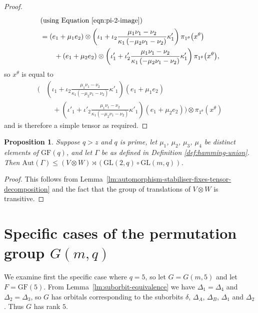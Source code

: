 \documentclass[10pt]{amsart}
\theoremstyle{definition}
\theoremstyle{plain}
\theoremstyle{plain}
\newtheorem{prop}[prop]{Proposition}
\theoremstyle{plain}
\theoremstyle{plain}
\newcommand{\Aut}{\mathrm{Aut}}
\newcommand{\GF}{\mathrm{GF}}
\newcommand{\GL}{\mathrm{GL}}
\begin{document}
\begin{proof}
\begin{align*}
    \intertext{(using Equation \eqref{eqn:pi-2-image}) }
    &= \left(e_1 + \mu_1 e_2 \right) \otimes \left(\iota_1 + \iota_2 \frac{\mu_1 \nu_1 - \nu_2}{\kappa_1 \left(-\mu_2 \nu_1 - \nu_2 \right)} \kappa'_1 \right) \pi_{1^\theta}{\left(x^\theta \right)} \\
    &\ \ \ \ \ \ + \left(e_1 + \mu_2 e_2 \right) \otimes \left(\iota'_1 + \iota'_2 \frac{\mu_1 \nu_1 - \nu_2}{\kappa_1 \left(-\mu_2 \nu_1 - \nu_2 \right)} \kappa'_1 \right) \pi_{1^\theta}{\left(x^\theta \right)},
\end{align*}
so $x^\theta$ is equal to
\begin{align*}
    \Bigg(&\left(\iota_1 + \iota_2 \frac{\mu_1 \nu_1 - \nu_2}{\kappa_1 \left(-\mu_2 \nu_1 - \nu_2 \right)} \kappa'_1 \right) \left(e_1 + \mu_1 e_2 \right)  \\
    &\quad + \left(\iota'_1 + \iota'_2 \frac{\mu_1 \nu_1 - \nu_2}{\kappa_1 \left(-\mu_2 \nu_1 - \nu_2 \right)} \kappa'_1 \right) \left(e_1 + \mu_2 e_2 \right)\Bigg) \otimes \pi_{1^\theta}{\left(x^\theta \right)}
\end{align*}
and is therefore a simple tensor as required.
\end{proof}

\begin{prop} \label{prop:automorphism-group-affine-decomp}
Suppose $q > z$ and $q$ is prime, let $\mu_1$, $\mu_2$, $\mu_3$, $\mu_4$ be distinct elements of $\GF{\left(q \right)}$, and let $\Gamma$ be as defined in Definition \ref{def:hamming-union}. Then $\Aut{\left(\Gamma \right)} \leqslant \left(V \otimes W \right) \rtimes \left(\GL{\left(2, q \right)} \circ \GL{\left(m, q \right)}\right)$.
\end{prop}
\begin{proof}
This follows from Lemma~\ref{lm:automorphism-stabiliser-fixes-tensor-decomposition} and the fact that the group of translations of $V \otimes W$ is transitive.
\end{proof}

\section{Specific cases of the permutation group \texorpdfstring{$G{\left(m, q \right)}$}{G(m,q)}} \label{sc:specific-values}

We examine first the specific case where $q = 5$, so let $G = G{\left(m, 5 \right)}$ and let $F = \GF{\left(5 \right)}$.
From Lemma~\ref{lm:suborbit-equivalence} we have $\Delta_1 = \Delta_4$ and $\Delta_2 = \Delta_3$, so $G$ has orbitals corresponding to the suborbits $\delta$, $\Delta_A$, $\Delta_B$, $\Delta_1$ and $\Delta_2$. Thus $G$ has rank $5$.
\end{document}
